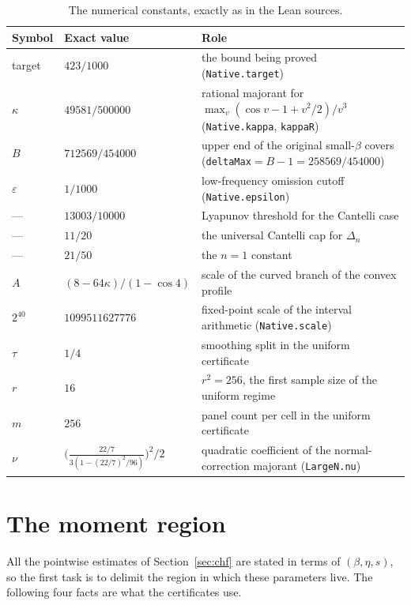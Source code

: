 \documentclass[11pt,a4paper]{article}
\theoremstyle{definition}
\newcommand{\kap}{\kappa}
\newcommand{\Lean}[1]{\texttt{#1}}
\begin{document}
\begin{table}[htbp]
  \centering
  \begin{tabular}{llp{7.6cm}}
    \toprule
    Symbol & Exact value & Role\\
    \midrule
    target & $423/1000$ & the bound being proved (\Lean{Native.target})\\
    $\kap$ & $49581/500000$ & rational majorant for $\max_v(\cos v-1+v^2/2)/v^3$ (\Lean{Native.kappa}, \Lean{kappaR})\\
    $B$ & $712569/454000$ & upper end of the original small-$\beta$ covers (\Lean{deltaMax}${}=B-1=258569/454000$)\\
    $\varepsilon$ & $1/1000$ & low-frequency omission cutoff (\Lean{Native.epsilon})\\
    --- & $13003/10000$ & Lyapunov threshold for the Cantelli case\\
    --- & $11/20$ & the universal Cantelli cap for $\Delta_n$\\
    --- & $21/50$ & the $n=1$ constant\\
    $A$ & $(8-64\kap)/(1-\cos4)$ & scale of the curved branch of the convex profile\\
    $2^{40}$ & $1099511627776$ & fixed-point scale of the interval arithmetic (\Lean{Native.scale})\\
    $\tau$ & $1/4$ & smoothing split in the uniform certificate\\
    $r$ & $16$ & $r^2=256$, the first sample size of the uniform regime\\
    $m$ & $256$ & panel count per cell in the uniform certificate\\
    $\nu$ & $\bigl(\tfrac{22/7}{3(1-(22/7)^2/96)}\bigr)^2\!/2$ & quadratic coefficient of the normal-correction majorant (\Lean{LargeN.nu})\\
    \bottomrule
  \end{tabular}
  \caption{The numerical constants, exactly as in the Lean sources.}
  \label{tab:constants}
\end{table}

\section{The moment region}
\label{sec:moments}

All the pointwise estimates of Section~\ref{sec:chf} are stated in terms of
$(\beta,\eta,s)$, so the first task is to delimit the region in which these
parameters live. The following four facts are what the certificates use.
\end{document}
